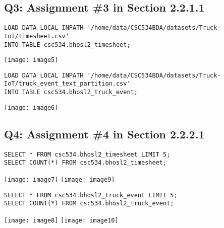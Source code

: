 \documentclass[]{article}
\begin{document}
\clearpage

\subsection*{Q3: Assignment \#3 in Section 2.2.1.1} 

\begin{verbatim}
LOAD DATA LOCAL INPATH '/home/data/CSC534BDA/datasets/Truck-IoT/timesheet.csv'
INTO TABLE csc534.bhosl2_timesheet;
\end{verbatim}
\texttt{[image: image5]} %

\begin{verbatim}
LOAD DATA LOCAL INPATH '/home/data/CSC534BDA/datasets/Truck-IoT/truck_event_text_partition.csv'
INTO TABLE csc534.bhosl2_truck_event;
\end{verbatim}
\texttt{[image: image6]} %

\subsection*{Q4: Assignment \#4 in Section 2.2.2.1} 

\begin{verbatim}
SELECT * FROM csc534.bhosl2_timesheet LIMIT 5;
SELECT COUNT(*) FROM csc534.bhosl2_timesheet;
\end{verbatim}
\texttt{[image: image7]} %
\texttt{[image: image9]} %

\clearpage 

\begin{verbatim}
SELECT * FROM csc534.bhosl2_truck_event LIMIT 5;
SELECT COUNT(*) FROM csc534.bhosl2_truck_event;
\end{verbatim}
\texttt{[image: image8]} %
\texttt{[image: image10]} %
\end{document}

